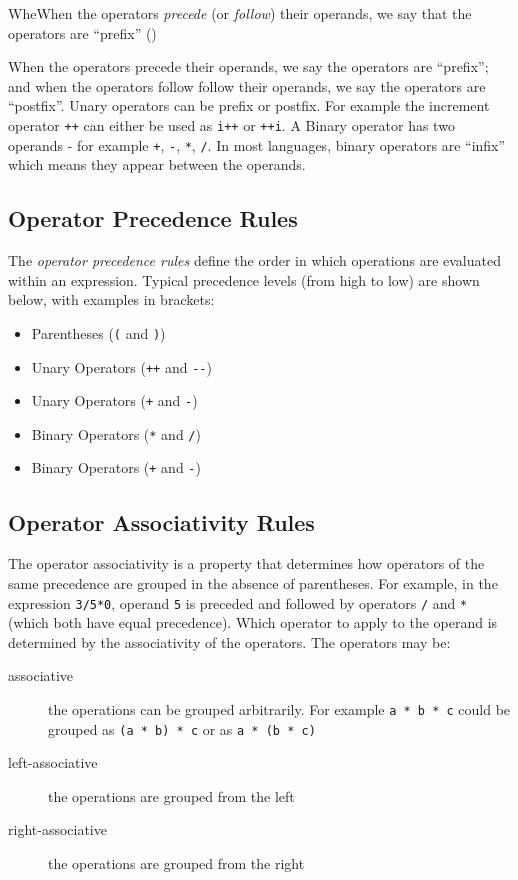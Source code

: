 WheWhen the operators \textit{precede} (or \textit{follow}) their operands, we say that the operators are ``prefix'' ()

When the operators precede their operands, we say the operators are ``prefix''; and when the operators follow follow their operands, we say the operators are ``postfix''. Unary operators can be prefix or postfix. For example the increment operator \verb|++| can either be used as \verb|i++| or \verb|++i|. A Binary operator has two operands - for example \verb|+|, \verb|-|, \verb|*|, \verb|/|. In most languages, binary operators are ``infix'' which means they appear between the operands.

\subsection{Operator Precedence Rules}
The \textit{operator precedence rules} define the order in which operations are evaluated within an expression. Typical precedence levels (from high to low) are shown below, with examples in brackets:
\begin{itemize}
    \item Parentheses (\verb|(| and \verb|)|)
    \item Unary Operators (\verb|++| and \verb|--|)
    \item Unary Operators (\verb|+| and \verb|-|)
    \item Binary Operators (\verb|*| and \verb|/|)
    \item Binary Operators (\verb|+| and \verb|-|)
\end{itemize}

\subsection{Operator Associativity Rules}
The operator associativity is a property that determines how operators of the same precedence are grouped in the absence of parentheses. For example, in the expression \verb|3/5*0|, operand \verb|5| is preceded and followed by operators \verb|/| and \verb|*| (which both have equal precedence). Which operator to apply to the operand is determined by the associativity of the operators. The operators may be:
\begin{description}
    \item[associative] the operations can be grouped arbitrarily. For example \verb|a * b * c| could be grouped as \verb|(a * b) * c| or as \verb|a * (b * c)|
    \item[left-associative] the operations are grouped from the left
    \item[right-associative] the operations are grouped from the right 
\end{description}

